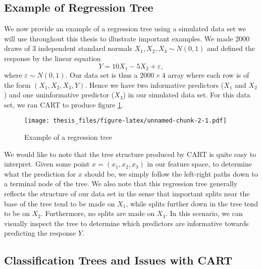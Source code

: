 \documentclass[12pt,twoside]{reedthesis}
\theoremstyle{definition}
\theoremstyle{definition}
\theoremstyle{definition}
\theoremstyle{remark}
\begin{document}
\subsection{Example of Regression
Tree}\label{example-of-regression-tree}

We now provide an example of a regression tree using a simulated data
set we will use throughout this thesis to illustrate important examples.
We made 2000 draws of 3 independent standard normals
\(X_1,X_2,X_3\sim N(0,1)\) and defined the response by the linear
equation \[Y=10X_1-5X_2+\varepsilon,\] where \(\varepsilon\sim N(0,1)\).
Our data set is thus a \(2000\times 4\) array where each row is of the
form \((X_1,X_2,X_3,Y)\). Hence we have two informative predictors
(\(X_1\) and \(X_2\)) and one uninformative predictor (\(X_3\)) in our
simulated data set. For this data set, we ran CART to produce figure
\ref{tree_ex}. \par  
\begin{figure}
\centering
\texttt{[image: thesis\_files/figure-latex/unnamed-chunk-2-1.pdf]}
\caption{\label{fig:unnamed-chunk-2}\label{tree_ex}Example of a regression
tree}
\end{figure}
We would like to note that the tree structure produced by CART is quite
easy to interpret. Given some point \(x=(x_1,x_2,x_3)\) in our feature
space, to determine what the prediction for \(x\) should be, we simply
follow the left-right paths down to a terminal node of the tree. We also
note that this regression tree generally reflects the structure of our
data set in the sense that important splits near the base of the tree
tend to be made on \(X_1\), while splits further down in the tree tend
to be on \(X_2\). Furthermore, no splits are made on \(X_3\). In this
scenario, we can visually inspect the tree to determine which predictors
are informative towards predicting the response \(Y\).

\subsection{Classification Trees and Issues with
CART}\label{classification-trees-and-issues-with-cart}
\end{document}
